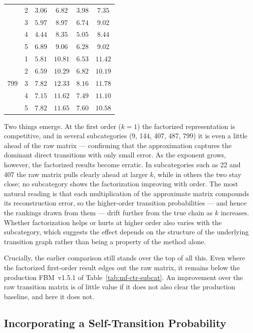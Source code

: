 \begin{table}[ht]
\begin{tabular}{clcccc}
      & 2 & $3.06$ & $6.82$ & $3.98$ & $7.35$ \\
      & 3 & $5.97$ & $8.97$ & $6.74$ & $9.02$ \\
      & 4 & $4.44$ & $8.35$ & $5.05$ & $8.44$ \\
      & 5 & $6.89$ & $9.06$ & $6.28$ & $9.02$ \\
    \midrule
    \multirow{5}{*}{799}
      & 1 & $5.81$ & $10.81$ & $6.53$ & $11.42$ \\
      & 2 & $6.59$ & $10.29$ & $6.82$ & $10.19$ \\
      & 3 & $7.82$ & $12.33$ & $8.16$ & $11.78$ \\
      & 4 & $7.15$ & $11.62$ & $7.49$ & $11.10$ \\
      & 5 & $7.82$ & $11.65$ & $7.60$ & $10.58$ \\
    \bottomrule
  \end{tabular}
\end{table}

Two things emerge. At the first order ($k=1$) the factorized representation is
competitive, and in several subcategories (9, 144, 407, 487, 799) it is even a
little ahead of the raw matrix --- confirming that the approximation captures the
dominant direct transitions with only small error. As the exponent grows,
however, the factorized results become erratic. In subcategories such as 22 and
407 the raw matrix pulls clearly ahead at larger $k$, while in others the two stay
close; no subcategory shows the factorization improving with order. The most
natural reading is that each multiplication of the approximate matrix compounds
its reconstruction error, so the higher-order transition probabilities --- and
hence the rankings drawn from them --- drift further from the true chain as $k$
increases. Whether factorization helps or hurts at higher order also varies with
the subcategory, which suggests the effect depends on the structure of the
underlying transition graph rather than being a property of the method alone.

Crucially, the earlier comparison still stands over the top of all this. Even
where the factorized first-order result edges out the raw matrix, it remains below
the production FBM~v1.5.1 of Table~\ref{tab:mf-ctr-subcat}. An improvement over
the raw transition matrix is of little value if it does not also clear the
production baseline, and here it does not.

\subsection{Incorporating a Self-Transition Probability}
\label{sec:mf-ctr-self}

